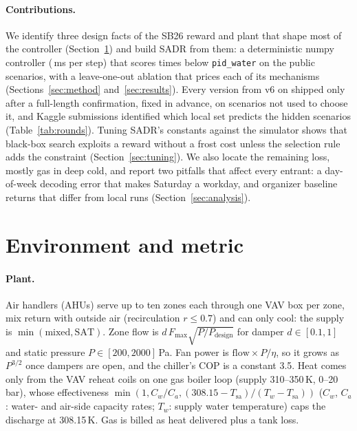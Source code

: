\documentclass{article}
\begin{document}
\paragraph{Contributions.} We identify three design facts of the SB26 reward and plant that shape most of the controller (Section~\ref{sec:env}) and build SADR from them: a deterministic numpy controller (\PolicyMsOurs{}\,ms per step) that scores \RElvPwTimes{} times below \texttt{pid\_water} on the public scenarios, with a leave-one-out ablation that prices each of its mechanisms (Sections~\ref{sec:method} and~\ref{sec:results}). Every version from v6 on shipped only after a full-length confirmation, fixed in advance, on scenarios not used to choose it, and Kaggle submissions identified which local set predicts the hidden scenarios (Table~\ref{tab:rounds}). Tuning SADR's constants against the simulator shows that black-box search exploits a reward without a frost cost unless the selection rule adds the constraint (Section~\ref{sec:tuning}). We also locate the remaining loss, mostly gas in deep cold, and report two pitfalls that affect every entrant: a day-of-week decoding error that makes Saturday a workday, and organizer baseline returns that differ from local runs (Section~\ref{sec:analysis}).

\section{Environment and metric}
\label{sec:env}

\paragraph{Plant.} Air handlers (AHUs) serve up to ten zones each through one VAV box per zone, mix return with outside air (recirculation $r\le 0.7$) and can only cool: the supply is $\min(\text{mixed}, \text{SAT})$. Zone flow is $d\,F_{\max}\sqrt{P/P_{\text{design}}}$ for damper $d\in[0.1,1]$ and static pressure $P\in[200,2000]$\,Pa. Fan power is $\text{flow}\times P/\eta$, so it grows as $P^{3/2}$ once dampers are open, and the chiller's COP is a constant 3.5. Heat comes only from the VAV reheat coils on one gas boiler loop (supply 310--350\,K, 0--20\,bar), whose effectiveness $\min(1, C_w/C_a, (308.15-T_{\text{sa}})/(T_w - T_{\text{sa}}))$ ($C_w$, $C_a$: water- and air-side capacity rates; $T_w$: supply water temperature) caps the discharge at 308.15\,K. Gas is billed as heat delivered plus a tank loss.
\end{document}
